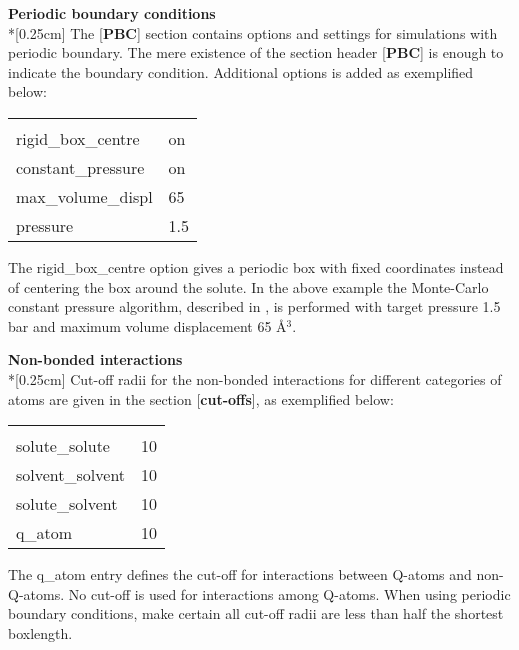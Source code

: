 \documentclass[a4paper,10pt]{article}
\begin{document}
\bigskip
\textbf{Periodic boundary conditions}\\*[0.25cm] The
[\textbf{PBC}] section contains options and settings for
simulations with periodic boundary. The mere existence of the
section header [\textbf{PBC}] is enough to indicate the boundary
condition. Additional options is added as exemplified below:

\begin{center}
\begin{tabularx}{\textwidth}{|l X|}
  \hline
  [PBC]                  & \\
  rigid{\_}box{\_}centre & on \\
  constant{\_}pressure   & on \\
  max{\_}volume{\_}displ & 65 \\
  pressure               & 1.5 \\ \hline
\end{tabularx}
\end{center}

The rigid{\_}box{\_}centre option gives a periodic box with fixed
coordinates instead of centering the box around the solute. In the
above example the Monte-Carlo constant pressure algorithm,
described in \cite{Wennerstroem}, is performed with target
pressure 1.5 bar and maximum volume displacement 65 {\AA}$^{3}$.

\bigskip
\textbf{Non-bonded interactions} \\*[0.25cm] Cut-off radii for the
non-bonded interactions for different categories of atoms are
given in the section [\textbf{cut-offs}], as exemplified below:

\begin{center}
\begin{tabularx}{\textwidth}{|l X|}
  \hline
  [cut-offs]         & \\
  solute{\_}solute   & 10 \\
  solvent{\_}solvent & 10 \\
  solute{\_}solvent  & 10 \\
  q{\_}atom          & 10 \\ \hline
\end{tabularx}
\end{center}

The q{\_}atom entry defines the cut-off for interactions between
Q-atoms and non-Q-atoms. No cut-off is used for interactions among
Q-atoms. When using periodic boundary conditions, make certain all
cut-off radii are less than half the shortest boxlength.
\end{document}
